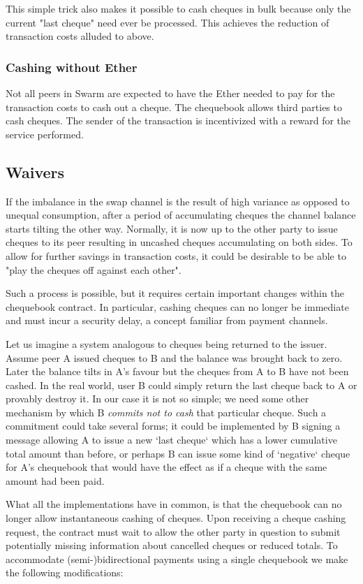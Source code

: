 This simple trick also makes it possible to cash cheques in bulk because only the current "last cheque" need ever be processed. This achieves the reduction of transaction costs alluded to above.

\subsubsection{Cashing without Ether}\label{sec:zero_eth}
Not all peers in Swarm are expected to have the Ether needed to pay for the transaction costs to cash out a cheque. The chequebook allows third parties to cash cheques. The sender of the transaction is incentivized with a reward for the service performed.

\subsection{Waivers}\label{sec:waiver}

If the imbalance in the swap channel is the result of high variance as opposed to unequal consumption, after a period of accumulating cheques the channel balance starts tilting the other way. Normally, it is now up to the other party to issue cheques to its peer resulting in uncashed cheques accumulating on both sides.
To allow for further savings in transaction costs, it could be desirable to be able to "play the cheques off against each other".

Such a process is possible, but it requires certain important changes within the chequebook contract. In particular, cashing cheques can no longer be immediate and must incur a security delay, a concept familiar from payment channels.

Let us imagine a system analogous to cheques being returned to the issuer. Assume peer A issued cheques to B and the balance was brought back to zero. Later the balance tilts in A's favour but the cheques from A to B have not been cashed. In the real world, user B could simply return the last cheque back to A or provably destroy it. In our case it is not so simple; we need some other mechanism by which B \emph{commits not to cash} that particular cheque. Such a commitment could take several forms; it could be implemented by B signing a message allowing A to issue a new `last cheque` which has a lower cumulative total amount than before, or perhaps B can issue some kind of `negative` cheque for A's chequebook that would have the effect as if a cheque with the same amount had been paid. 

What all the implementations have in common, is that the chequebook can no longer allow instantaneous cashing of cheques. Upon receiving a cheque cashing request, the contract must wait to allow the other party in question to submit potentially missing information about cancelled cheques or reduced totals. To accommodate (semi-)bidirectional payments using a single chequebook we make the following modifications:

